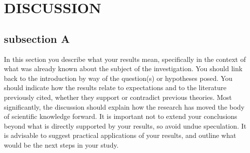 \documentclass[a4paper, 10pt, conference]{ieeeconf}      %
\begin{document}
\section{DISCUSSION}

\subsection{subsection A}

In this section you describe what your results mean, specifically in the context of what was already known about the subject of the investigation. You should link back to the introduction by way of the question(s) or hypotheses posed. You should indicate how the results relate to expectations and to the literature previously cited, whether they support or contradict previous theories. Most significantly, the discussion should explain how the research has moved the body of scientific knowledge forward. It is important not to extend your conclusions beyond what is directly supported by your results, so avoid undue speculation. It is advisable to suggest practical applications of your results, and outline what would be the next steps in your study.
\end{document}
